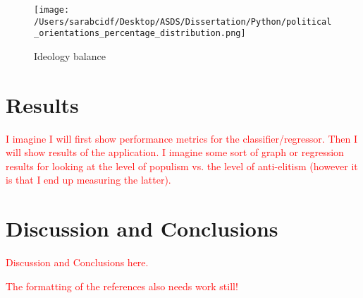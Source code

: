 \documentclass[12pt,letterpaper]{article}
\begin{document}
\begin{figure}[h]
	\centering
	\caption{Ideology balance}
	\label{fig:yourfigure}
	\texttt{[image: /Users/sarabcidf/Desktop/ASDS/Dissertation/Python/political\_orientations\_percentage\_distribution.png]} 
\end{figure}

\section*{Results} 
\vspace{.25cm}

\noindent \textcolor{red}{I imagine I will first show performance metrics for the classifier/regressor. 
	Then I will show results of the application. I imagine some sort of graph or regression results for looking at the level of populism vs. the level of anti-elitism (however it is that I end up measuring the latter).} 

\section*{Discussion and Conclusions} 
\vspace{.25cm}

\noindent \textcolor{red}{Discussion and Conclusions here.}

\printbibliography

\noindent \textcolor{red}{The formatting of the references also needs work still!}
\end{document}
